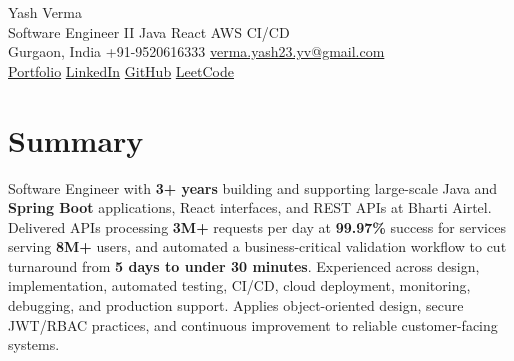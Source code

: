 \documentclass[letterpaper,11pt]{article}
\begin{document}
\begin{center}
  {\Huge Yash Verma} \\
  \small Software Engineer II \textperiodcentered{} Java \textperiodcentered{} React \textperiodcentered{} AWS \textperiodcentered{} CI/CD \\
  \vspace{5pt}
  \small Gurgaon, India \textbar{} +91-9520616333 \textbar{}
  \href{mailto:verma.yash23.yv@gmail.com}{verma.yash23.yv@gmail.com} \\
  \vspace{7pt}
  \href{https://yashverma230600.github.io/yash-portfolio/}{Portfolio} \textbar{}
  \href{https://www.linkedin.com/in/yash-verma-9243a7193/}{LinkedIn} \textbar{}
  \href{https://github.com/yashverma230600}{GitHub} \textbar{}
  \href{https://leetcode.com/yashverma230600}{LeetCode}
  \vspace{-8pt}
\end{center}

\section{Summary}
\begin{itemize}[leftmargin=0.15in, label={}]
  \small{\item{
    Software Engineer with \textbf{3+ years} building and supporting large-scale Java and \textbf{Spring Boot} applications, React interfaces, and REST APIs at Bharti Airtel. Delivered APIs processing \textbf{3M+} requests per day at \textbf{99.97\%} success for services serving \textbf{8M+} users, and automated a business-critical validation workflow to cut turnaround from \textbf{5 days to under 30 minutes}. Experienced across design, implementation, automated testing, CI/CD, cloud deployment, monitoring, debugging, and production support. Applies object-oriented design, secure JWT/RBAC practices, and continuous improvement to reliable customer-facing systems.
  }}
\end{itemize}
\vspace{-8pt}

\end{document}
